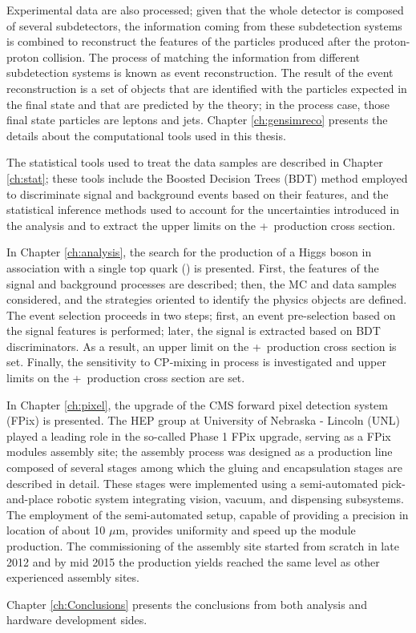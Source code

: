 Experimental data are also processed; given that the whole detector is composed of several subdetectors, the information coming from these subdetection systems is combined to reconstruct the features of the particles produced after the proton-proton collision. The process of matching the information from different subdetection systems is known as event reconstruction. The result of the event reconstruction is a set of objects that are identified with the particles expected in the final state and that are predicted by the theory; in the \tH process case, those final state particles are leptons and jets. Chapter \ref{ch:gensimreco} presents the details about the computational tools used in this thesis.  

The statistical tools used to treat the data samples are described in Chapter \ref{ch:stat}; these tools include the Boosted Decision Trees (BDT) method employed to discriminate signal and background events based on their features, and the statistical inference methods used to account for the uncertainties introduced in the analysis and to extract the upper limits on the \tH+\ttH\ production cross section. 


In Chapter \ref{ch:analysis}, the search for the production of a Higgs boson in association with a single top quark (\tH) is presented. First, the features of the signal and background processes are described; then, the MC and data samples considered, and the strategies oriented to identify the physics objects are defined. The event selection proceeds in two steps; first, an event pre-selection based on the signal features is performed; later, the signal is extracted based on BDT discriminators. As a result, an upper limit on the \tH+\ttH\ production cross section is set. Finally, the  sensitivity to CP-mixing in \tH process is investigated and upper limits on the \tH+\ttH\ production cross section are set.   

In Chapter \ref{ch:pixel}, the upgrade of the CMS forward pixel detection system (FPix) is presented. The HEP group at University of Nebraska - Lincoln (UNL) played a leading role in the so-called Phase 1 FPix upgrade, serving as a FPix modules assembly site; the assembly process was designed as a production line composed of several stages among which the gluing and encapsulation stages are described in detail. These stages were implemented using a semi-automated pick-and-place robotic system integrating vision, vacuum, and dispensing subsystems. The employment of the semi-automated setup, capable of providing a precision in location of about 10 $\mu$m, provides uniformity and speed up the module production. The commissioning of the assembly site started from scratch in late 2012 and by mid 2015 the production yields reached the same level as other experienced assembly sites.

Chapter \ref{ch:Conclusions} presents the conclusions from both analysis and hardware development sides.

